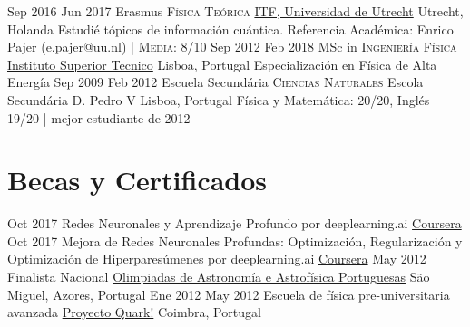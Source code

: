 \documentclass[letterpaper]{twentysecondcv} %
\begin{document}
\begin{twenty} %
	\twentyitem
    	{Sep 2016}
        {Jun 2017}
        {Erasmus \@ \textsc{Física Teórica}}
        {\href{http://web.science.uu.nl/itf/}{ITF, Universidad de Utrecht}}
        {Utrecht, Holanda}
        {Estudié tópicos de información cuántica.
        Referencia Académica: Enrico Pajer (\href{mailto:e.pajer@uu.nl}{e.pajer@uu.nl}) | \normalsize \textsc{Media}: 8/10}
	\twentyitem
    	{Sep 2012}
		{Feb 2018}
        {MSc in \textsc{\href{https://www.youtube.com/watch?v=0eoa0f5nVA0}{Ingeniería Física}} \faYoutubePlay}
        {\href{https://www.youtube.com/watch?v=EGue8EwE3mI}{Instituto Superior Tecnico} \faYoutubePlay}
        {Lisboa, Portugal}
        {Especialización en Física de Alta Energía}
    \twentyitem
        {Sep 2009}
        {Feb 2012}
        {Escuela Secundária \@ \textsc{Ciencias Naturales}}
        {Escola Secundária D. Pedro V}
        {Lisboa, Portugal}
        {Física y Matemática: 20/20, Inglés 19/20 | mejor estudiante de 2012}
\end{twenty}

\newpage

\continuesidebar

\section{Becas y Certificados}
\begin{twenty} %
    \twentyitem
        {Oct 2017}
        {}
        {Redes Neuronales y Aprendizaje Profundo por deeplearning.ai}
        {\href{https://www.coursera.org/account/accomplishments/records/CF342FNNVUXY}{Coursera}}
        {}
        {}
    \twentyitem
        {Oct 2017}
        {}
        {Mejora de Redes Neuronales Profundas: Optimización, Regularización y Optimización de Hiperparesúmenes por deeplearning.ai}
        {\href{https://www.coursera.org/account/accomplishments/records/MQVCJFJ849GK}{Coursera}}
        {}
        {}
    \twentyitem
        {May 2012}
        {}
        {Finalista Nacional}
        {\href{http://www.sp-astronomia.pt/olimpiadas}{Olimpiadas de Astronomía e Astrofísica Portuguesas}}
        {São Miguel, Azores, Portugal}
        {}
    \twentyitem
        {Ene 2012}
        {May 2012}
        {Escuela de física pre-universitaria avanzada}
        {\href{http://quark.fis.uc.pt/}{Proyecto Quark!}}
        {Coimbra, Portugal}
        {}
\end{twenty}
\vspace{-0.5cm}
\end{document}
